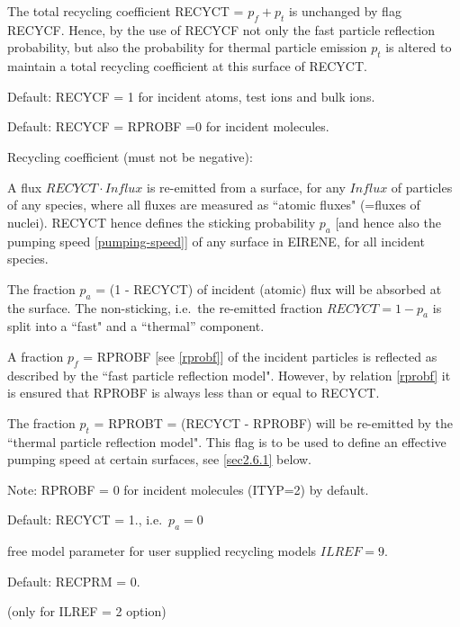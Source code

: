 \begin{description}
        The total recycling coefficient RECYCT = $p_f + p_t$ is unchanged by flag
        RECYCF.
        Hence, by the use of RECYCF not only the fast particle reflection probability,
        but also the probability for thermal particle emission $p_t$ is altered to
        maintain a total recycling coefficient at this surface of RECYCT.

        Default: RECYCF = 1 for incident atoms, test ions and bulk ions.

        Default: RECYCF = RPROBF =0 for incident molecules.
  \item[RECYCT] Recycling coefficient (must not be negative):

        A flux $RECYCT \cdot Influx$ is re-emitted from a surface, for any $Influx$ of
        particles of any species, where all fluxes are measured as ``atomic fluxes"
        (=fluxes of nuclei).
        RECYCT hence defines the sticking probability $p_a$ [and hence also the pumping
            speed \cref{pumping-speed}] of any surface in EIRENE, for all incident species.

        The fraction $p_a$ = (1 - RECYCT) of incident (atomic) flux will be absorbed at
        the surface.
        The non-sticking, i.e.\ the re-emitted fraction $RECYCT=1-p_a$ is split into a
        ``fast" and a ``thermal'' component.

        A fraction $p_f$ = RPROBF [see \cref{rprobf}] of the incident particles is
        reflected as described by the ``fast particle reflection model".
        However, by relation \cref{rprobf} it is ensured that RPROBF is always less
        than or equal to RECYCT.

        The fraction $p_t$ = RPROBT = (RECYCT - RPROBF) will be re-emitted by the
        ``thermal particle reflection model".
        This flag is to be used to define an effective pumping speed at certain
        surfaces, see \cref{sec2.6.1} below.

        Note: RPROBF = 0 for incident molecules (ITYP=2) by default.

        Default: RECYCT = 1., i.e.\ $p_a = 0$
  \item[RECPRM] free model parameter for
        user supplied recycling models $ILREF=9$.

        Default: RECPRM = 0.

  \item[EXPPL] (only for ILREF = 2 option) 


\end{description}
